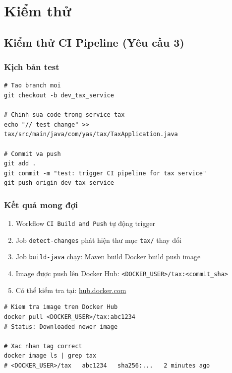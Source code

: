 \chapter{Kiểm thử}

\section{Kiểm thử CI Pipeline (Yêu cầu 3)}

\subsection{Kịch bản test}

\begin{lstlisting}[style=bashstyle, caption=Test CI pipeline]
# Tao branch moi
git checkout -b dev_tax_service

# Chinh sua code trong service tax
echo "// test change" >> tax/src/main/java/com/yas/tax/TaxApplication.java

# Commit va push
git add .
git commit -m "test: trigger CI pipeline for tax service"
git push origin dev_tax_service
\end{lstlisting}

\subsection{Kết quả mong đợi}

\begin{enumerate}
  \item Workflow \texttt{CI Build and Push} tự động trigger
  \item Job \texttt{detect-changes} phát hiện thư mục \texttt{tax/} thay đổi
  \item Job \texttt{build-java} chạy: Maven build \textrightarrow{} Docker build \textrightarrow{} push image
  \item Image được push lên Docker Hub: \texttt{<DOCKER\_USER>/tax:<commit\_sha>}
  \item Có thể kiểm tra tại: \href{https://hub.docker.com}{hub.docker.com}
\end{enumerate}

\begin{successbox}
\begin{lstlisting}[style=bashstyle]
# Kiem tra image tren Docker Hub
docker pull <DOCKER_USER>/tax:abc1234
# Status: Downloaded newer image

# Xac nhan tag correct
docker image ls | grep tax
# <DOCKER_USER>/tax   abc1234   sha256:...   2 minutes ago
\end{lstlisting}
\end{successbox}

